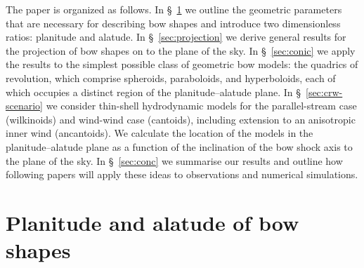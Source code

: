 

The paper is organized as follows.
%
In \S~\ref{sec:plan-alat-bow} we outline the geometric parameters that
are necessary for describing bow shapes and introduce two
dimensionless ratios: planitude and alatude.
%
In \S~\ref{sec:projection} we derive general results for the
projection of bow shapes on to the plane of the sky.
%
In \S~\ref{sec:conic} we apply the results to the simplest possible
class of geometric bow models: the quadrics of revolution, which
comprise spheroids, paraboloids, and hyperboloids, each of which
occupies a distinct region of the planitude--alatude plane.
%
In \S~\ref{sec:crw-scenario} we consider thin-shell hydrodynamic
models for the parallel-stream case (wilkinoids) and wind-wind case
(cantoids), including extension to an anisotropic inner wind
(ancantoids).  We calculate the location of the models in the
planitude--alatude plane as a function of the inclination of the bow
shock axis to the plane of the sky.
%
In \S~\ref{sec:conc} we summarise our results and outline how
following papers will apply these ideas to observations and numerical
simulations.



\section{Planitude and alatude of bow shapes}
\label{sec:plan-alat-bow}

